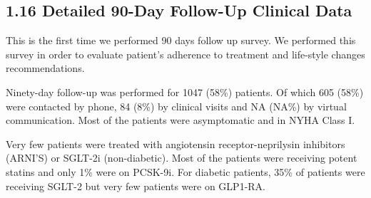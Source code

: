\documentclass[
]{article}
\begin{document}
\pagebreak

\subsection{1.16 Detailed 90-Day Follow-Up Clinical
Data}\label{detailed-90-day-follow-up-clinical-data}

This is the first time we performed 90 days follow up survey. We
performed this survey in order to evaluate patient's adherence to
treatment and life-style changes recommendations.

Ninety-day follow-up was performed for 1047 (58\%) patients. Of which
605 (58\%) were contacted by phone, 84 (8\%) by clinical visits and NA
(NA\%) by virtual communication. Most of the patients were asymptomatic
and in NYHA Class I.

Very few patients were treated with angiotensin receptor-neprilysin
inhibitors (ARNI'S) or SGLT-2i (non-diabetic). Most of the patients were
receiving potent statins and only 1\% were on PCSK-9i. For diabetic
patients, 35\% of patients were receiving SGLT-2 but very few patients
were on GLP1-RA.

~
\end{document}
